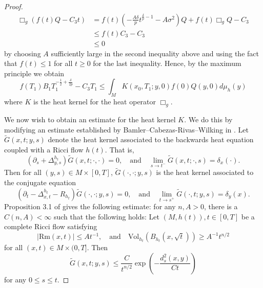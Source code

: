 \documentclass[12pt]{amsart}
\theoremstyle{plain}
\theoremstyle{plain}
\theoremstyle{definition}
\theoremstyle{remark}
\numberwithin{equation}{subsection}
\begin{document}
\begin{proof}
\begin{align}
        \Box_g\left(f(t)Q-C_3t\right) &= f(t)\left(-\frac{A\delta}{p}t^{\frac{\delta}{p}-1} - A\sigma^2\right)Q + f(t)\Box_g Q - C_3 \nonumber \\
        &\leq f(t)C_3 - C_3 \nonumber \\
        &\leq 0
    \end{align}
    by choosing $A$ sufficiently large in the second inequality above and using the fact that $f(t) \leq 1$ for all $t \geq 0$ for the last inequality.
    Hence, by the maximum principle we obtain
    \begin{equation}\label{eqn:gradient-estimate-invoke-heat-kernel}
        f(T_1)B_1T_1^{-\frac{1}{2}+\frac{\delta}{2p}} - C_3T_1 \leq \int_{M} K(x_0, T_1; y, 0)f(0)Q(y,0)d\mu_h(y)
    \end{equation}
    where $K$ is the heat kernel for the heat operator $\Box_g$.
    
    We now wish to obtain an estimate for the heat kernel $K$. We do this by modifying an estimate established by Bamler--Cabezas-Rivas--Wilking in \cite{bamler_ricci_2017}. Let $\widetilde{G}(x,t;y,s)$ denote the heat kernel associated to the backwards heat equation coupled with a Ricci flow $h(t)$. That is,
    \begin{equation*}
        \left(\partial_s + \Delta^{h_t}_{y,s}\right)\widetilde{G}(x,t;\cdot,\cdot) = 0,\quad \text{and} \quad \lim\limits_{s\to t^-}\widetilde{G}(x,t;\cdot,s) = \delta_x(\cdot).
    \end{equation*}
    Then for all $(y,s) \in M \times [0,T]$, $\widetilde{G}(\cdot,\cdot;y,s)$ is the heat kernel associated to the conjugate equation
    \begin{equation*}
        \left(\partial_t - \Delta^{h_t}_{x,t} - R_{h_t}\right)\widetilde{G}(\cdot,\cdot;y,s) = 0,\quad \text{and} \quad \lim\limits_{t\to s^+}\widetilde{G}(\cdot,t;y,s) = \delta_y(x).
    \end{equation*}
    Proposition 3.1 of \cite{bamler_ricci_2017} gives the following estimate: for any $n, A > 0$, there is a $C(n,A) < \infty$ such that the following holds: Let $(M, h(t)), t\in[0,T]$ be a complete Ricci flow satisfying
    \begin{equation}\label{eqn:BCW-estimate-heat-kernel-assumptions}
        |\text{Rm}(x,t)| \leq At^{-1},\quad \text{and} \quad \text{Vol}_{h_t}\left(B_{h_t}(x,\sqrt{t})\right) \geq A^{-1}t^{n/2}
    \end{equation}
    for all $(x,t)\in M\times(0,T]$. Then
    \begin{equation}\label{eqn:BCW-estimate}
        \widetilde{G}(x,t;y,s) \leq \frac{C}{t^{n/2}}\exp{\left(-\frac{d^2_s(x,y)}{Ct}\right)}
    \end{equation}
    for any $0 \leq s \leq t$. 
    

\end{proof}
\end{document}
